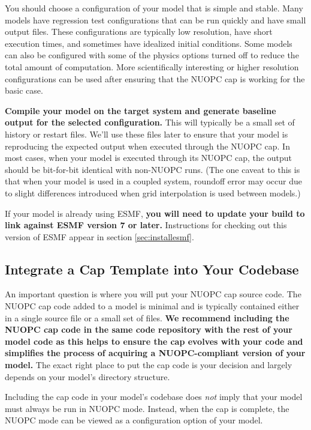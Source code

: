 You should choose a configuration of your model that is
simple and stable. Many models have regression test configurations
that can be run quickly and have small output files.  These configurations
are typically low resolution, have short execution times, and sometimes
have idealized initial conditions.  Some models can also be configured
with some of the physics options turned off to reduce the total amount
of computation.  More scientifically interesting or higher resolution configurations
can be used after ensuring that the NUOPC cap is working for the
basic case.

\textbf{Compile your model on the target system and generate baseline output for the
selected configuration.}   This will typically be a small set of history or restart
files.  We'll use these files later to ensure that your model is reproducing the
expected output when executed through the NUOPC cap.  In most cases, when
your model is executed through its NUOPC cap, the output should be bit-for-bit
identical with non-NUOPC runs.  (The one caveat to this is that when your
model is used in a coupled system, roundoff error may occur due to slight
differences introduced when grid interpolation is used between models.)

If your model is already using ESMF, \textbf{you will need to
update your build to link against ESMF version 7 or later.}  Instructions for checking out this version of ESMF
appear in section \ref{sec:installesmf}.


\subsection{Integrate a Cap Template into Your Codebase}
\label{sec:integratecap}
An important question is where you will put your NUOPC cap source code.
The NUOPC cap code added to a model is minimal and is typically
contained either in a single source file or a small set of files.  \textbf{We recommend
including the NUOPC cap code in the same code repository with the rest of your
model code as this helps to ensure the cap evolves with your code and simplifies
the process of acquiring a NUOPC-compliant version of your model.}
The exact right place to put the cap code is your decision and largely depends
on your model's directory structure.

Including the cap code in your model's codebase does \emph{not} imply that your
model must always be run in NUOPC mode.  Instead, when the cap is complete,
the NUOPC mode can be viewed as a configuration option of your model.

